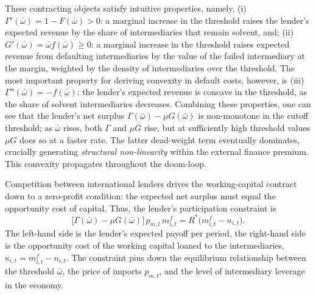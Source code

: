 \documentclass[11pt]{article}
\theoremstyle{definition}
\theoremstyle{plain}
\theoremstyle{remark}
\newcommand{\mf}{m^{f}}
\newcommand{\Rstar}{R^{*}}
\begin{document}
These contracting objects satisfy intuitive properties, namely, (i) $\Gamma'(\bar{\omega}) = 1 - F(\bar{\omega}) > 0$: a marginal increase in the threshold raises the lender's expected revenue by the share of intermediaries that remain solvent, and; (ii) $G'(\bar{\omega}) = \bar{\omega} f(\bar{\omega}) \geq 0$: a marginal increase in the threshold raises expected revenue from defaulting intermediaries by the value of the failed intermediary at the margin, weighted by the density of intermediaries over the threshold. The most important property for deriving convexity in default costs, however, is (iii) $\Gamma''(\bar \omega)=-f(\bar \omega)$: the lender's expected revenue is concave in the threshold, as the share of solvent intermediaries decreases. Combining these properties, one can see that the lender's net surplus $\Gamma(\bar{\omega}) - \mu G(\bar{\omega})$ is non-monotone in the cutoff threshold; as $\bar \omega$ rises, both $\Gamma$ and $\mu G$ rise, but at sufficiently high threshold values $\mu G$ does so at a faster rate. The latter dead-weight term eventually dominates, crucially generating \textit{structural non-linearity} within the external finance premium. This convexity propagates throughout the doom-loop. 

Competition between international lenders drives the working-capital contract down to a zero-profit condition: the expected net surplus must equal the opportunity cost of capital. Thus, the lender's participation constraint is
\begin{equation}\label{eq:lender_zp}
\bigl[\Gamma(\bar{\omega}) - \mu G(\bar{\omega})\bigr]\,p_{m,t}\,\mf_{i,t} = \Rstar\bigl( \mf_{i,t} - n_{i,t}\bigr).
\end{equation}
The left-hand side is the lender's expected payoff per period, the right-hand side is the opportunity cost of the working capital loaned to the intermediaries, $\kappa_{i,t} = \mf_{i,t} - n_{i,t}$. The constraint pins down the equilibrium relationship between the threshold $\bar{\omega}$, the price of imports $p_{m,t}$, and the level of intermediary leverage in the economy.
\end{document}
